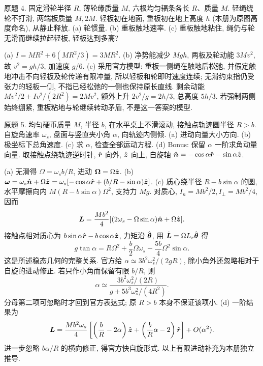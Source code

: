 \begin{exercise}
原题 4. 固定滑轮半径 $R$, 薄轮缘质量 $M$, 六根均匀辐条各长 $R$、质量 $M$. 轻绳绕轮不打滑, 两端板质量 $M,2M$. 轻板初在地面, 重板初在地上高度 $h$ (本册为原图高度命名), 从静止释放. (a) 轮惯量. (b) 重板触地速率. (c) 重板触地粘住, 绳仍与轮无滑而继续拉起轻板, 轻板达到多高?
\end{exercise}
\begin{solution}
(a) $I=MR^2+6(MR^2/3)=3MR^2$. (b) 净势能减少 $Mgh$, 两板及轮动能 $3Mv^2$, 故 $v^2=gh/3$, 加速度 $g/6$. (c) 采用官方模型: 重板一侧绳在触地后松弛, 并假定触地冲击不向轻板及轮传递有限冲量, 所以轻板和轮即时速度连续; 无滑约束指仍受张力的轻板一侧, 不指已经松弛的一侧也保持原长直线. 剩余动能 $Mv^2/2+Iv^2/(2R^2)=2Mv^2$, 额外上升 $2v^2/g=2h/3$, 总高度 $5h/3$. 若强制两侧始终绷紧, 重板粘地与轮继续转动矛盾, 不是这一答案的模型.
\end{solution}
\begin{exercise}
原题 5. 均匀硬币质量 $M$, 半径 $b$, 在水平桌上不滑滚动, 接触点轨迹圆半径 $R>b$. 自旋角速率 $\omega_s$, 盘面与竖直夹小角 $\alpha$, 向轨迹内侧倾. (a) 进动向量大小方向. (b) 极坐标下总角速度. (c) 求 $\alpha$, 检查全部运动方程. (d) Bonus: 保留 $\alpha$ 一阶求角动量向量. 取接触点绕轨迹逆时针, $\hat{\boldsymbol{r}}$ 向外, $\hat{\boldsymbol{z}}$ 向上, 自旋轴 $\hat{\boldsymbol{n}}=-\cos\alpha\hat{\boldsymbol{r}}-\sin\alpha\hat{\boldsymbol{z}}$.
\end{exercise}
\begin{solution}
(a) 无滑得 $\Omega=\omega_sb/R$, 进动 $\boldsymbol{\Omega}=\Omega\hat{\boldsymbol{z}}$. (b) $\boldsymbol{\omega}=\omega_s\hat{\boldsymbol{n}}+\Omega\hat{\boldsymbol{z}}=\omega_s[-\cos\alpha\hat{\boldsymbol{r}}+(b/R-\sin\alpha)\hat{\boldsymbol{z}}]$. (c) 质心绕半径 $R-b\sin\alpha$ 的圆, 水平摩擦向内 $M(R-b\sin\alpha)\Omega^2$, 支持力 $Mg$. 对质心, $I_n=Mb^2/2,I_\perp=Mb^2/4$, 因而
\[\boldsymbol{L}=\frac{Mb^2}4[(2\omega_s-\Omega\sin\alpha)\hat{\boldsymbol{n}}+\Omega\hat{\boldsymbol{z}}].\]
接触点相对质心为 $b\sin\alpha\hat{\boldsymbol{r}}-b\cos\alpha\hat{\boldsymbol{z}}$, 力矩沿 $\hat{\boldsymbol{\theta}}$, 用 $\dot{\boldsymbol{L}}=\Omega L_r\hat{\boldsymbol{\theta}}$ 得
\[g\tan\alpha=R\Omega^2+\frac b2\Omega\omega_s-\frac{5b}4\Omega^2\sin\alpha.\]
这是所述稳态几何的完整关系. 官方给 $\alpha\simeq3b^2\omega_s^2/(2gR)$, 除小角外还忽略相对于自旋的进动修正. 若只作小角而保留有限 $b/R$, 则
\[\alpha\simeq\frac{3b^2\omega_s^2/(2R)}{g+5b^3\omega_s^2/(4R^2)}.\]
分母第二项可忽略时才回到官方表达式; 原 $R>b$ 本身不保证该项小. (d) 一阶结果为
\[\boldsymbol{L}=\frac{Mb^2\omega_s}4\left[\left(\frac bR-2\alpha\right)\hat{\boldsymbol{z}}+\left(\frac bR\alpha-2\right)\hat{\boldsymbol{r}}\right]+O(\alpha^2).\]
进一步忽略 $b\alpha/R$ 的横向修正, 得官方快自旋形式. 以上有限进动补充为本册独立推导.
\end{solution}

